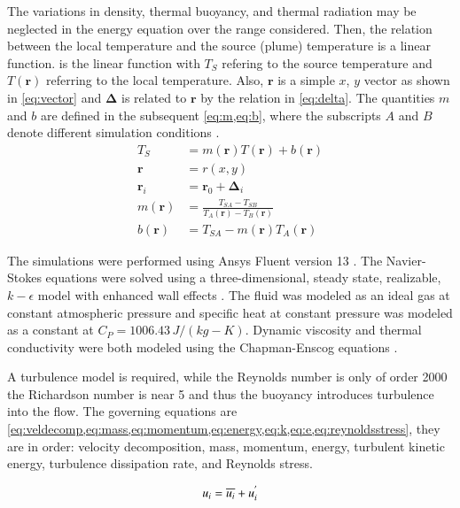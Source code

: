 \documentclass[preprint,12pt]{elsarticle}
\newcommand{\bv}[1]{\boldsymbol #1}  %
\begin{document}
The variations in density, thermal buoyancy, and thermal radiation may be neglected in the energy equation over the range considered.  Then, the relation between the local temperature and the source (plume) temperature is a linear function.   is the linear function with $T_S$ refering to the source temperature and $T\left( \bv r \right)$ referring to the local temperature.  Also, $\bv r$ is a simple $x$, $y$ vector as shown in \cref{eq:vector} and $\bv \Delta$ is related to $\bv r$ by the relation in \cref{eq:delta}.  The quantities $m$ and $b$ are defined in the subsequent \cref{eq:m,eq:b}, where the subscripts $A$ and $B$ denote different simulation conditions \cite{ijhmt1}.
\begin{subequations}
\label{eq:linearset}
\begin{align}
T_S &= m\left(  \bv r  \right) T\left( \bv r \right) + b\left( \bv r \right) \label{eq:linear} \\
\bv r &= r\left( x, y\right) \label{eq:vector}\\
\bv{r_i} & = \bv{r_0} + \bv{\Delta_i} \label{eq:delta}\\
m\left( \bv r \right) &= \frac{T_{SA} - T_{SB}}{T_A \left( \bv r \right) - T_B\left( \bv r \right)} \label{eq:m} \\
b\left( \bv r \right) &= T_{SA} - m\left( \bv r \right) T_A \left( \bv r \right) \label{eq:b}
\end{align}
\end{subequations}

The simulations were performed using Ansys Fluent version 13 \cite{fluentsoftware}.  The Navier-Stokes equations were solved using a three-dimensional, steady state, realizable, $k-\epsilon$ model with enhanced wall effects \cite{ijhmt1}.  The fluid was modeled as an ideal gas at constant atmospheric pressure and specific heat at constant pressure was modeled as a constant at $C_P = 1006.43\, J/(kg-K)$.  Dynamic viscosity and thermal conductivity were both modeled using the Chapman-Enscog equations \cite{ijhmt1}.  

A turbulence model is required, while the Reynolds number is only of order 2000 the Richardson number is near 5 and thus the buoyancy introduces turbulence into the flow.  The governing equations are \cref{eq:veldecomp,eq:mass,eq:momentum,eq:energy,eq:k,eq:e,eq:reynoldsstress}, they are in order: velocity decomposition, mass, momentum, energy, turbulent kinetic energy, turbulence dissipation rate, and Reynolds stress.

\begin{equation}
\centering
u_i = \overline{u_i} + u^{'}_{i}
\label{eq:veldecomp}
\end{equation}
\end{document}
